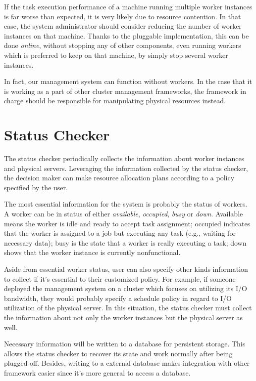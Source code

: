If the task execution performance of a machine running multiple worker
instances is far worse than expected, it is very likely due to resource
contention.  In that case, the system administrator should consider
reducing the number of worker instances on that machine.  Thanks to the
pluggable implementation, this can be done \emph{online}, without
stopping any of other components, even running workers which is
preferred to keep on that machine, by simply stop several worker
instances.

In fact, our management system can function without workers.  In the
case that it is working as a part of other cluster management
frameworks, the framework in charge should be responsible for
manipulating physical resources instead.

\section{Status Checker}

The status checker periodically collects the information about worker
instances and physical servers.  Leveraging the information collected
by the status checker, the decision maker can make resource allocation
plans according to a policy specified by the user.

The most essential information for the system is probably the status of
workers.  A worker can be in status of either \emph{available},
\emph{occupied}, \emph{busy} or \emph{down}.  Available means the worker
is idle and ready to accept task assignment; occupied indicates that the
worker is assigned to a job but executing any task (e.g., waiting for
necessary data); busy is the state that a worker is really executing a
task; down shows that the worker instance is currently nonfunctional. 

Aside from essential worker status, user can also specify other kinds
information to collect if it's essential to  their customized policy.
For example, if someone deployed the management system on a cluster
which focuses on utilizing its I/O bandwidth, they would probably
specify a schedule policy in regard to I/O utilization of the
physical server.  In this situation, the status checker must collect the
information about not only the worker instances but the physical server
as well.

Necessary information will be written to a database for persistent
storage.  This allows the status checker to recover its state and work
normally after being plugged off.  Besides, writing to a external
database makes integration with other framework easier since it's more
general to access a database.

